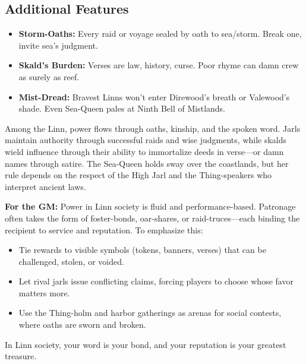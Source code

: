 \subsection*{Additional Features}
\begin{itemize}
\item \textbf{Storm-Oaths:} Every raid or voyage sealed by oath to sea/storm. Break one, invite sea's judgment.
\item \textbf{Skald's Burden:} Verses are law, history, curse. Poor rhyme can damn crew as surely as reef.
\item \textbf{Mist-Dread:} Bravest Linns won't enter Direwood's breath or Valewood's shade. Even Sea-Queen pales at Ninth Bell of Mistlands.
\end{itemize}

\begin{tcolorbox}[colback=black!3,colframe=black!40!white,title={Patronage \& Power}]
Among the Linn, power flows through oaths, kinship, and the spoken word. Jarls maintain authority through successful raids and wise judgments, while skalds wield influence through their ability to immortalize deeds in verse---or damn names through satire. The Sea-Queen holds sway over the coastlands, but her rule depends on the respect of the High Jarl and the Thing-speakers who interpret ancient laws. 

\textbf{For the GM:}  
Power in Linn society is fluid and performance-based. Patronage often takes the form of foster-bonds, oar-shares, or raid-truces---each binding the recipient to service and reputation. To emphasize this:

\begin{itemize}
    \item Tie rewards to visible symbols (tokens, banners, verses) that can be challenged, stolen, or voided.
    \item Let rival jarls issue conflicting claims, forcing players to choose whose favor matters more.
    \item Use the Thing-holm and harbor gatherings as arenas for social contests, where oaths are sworn and broken.
    \end{itemize}
    In Linn society, your word is your bond, and your reputation is your greatest treasure.
    \end{tcolorbox}
    
    

